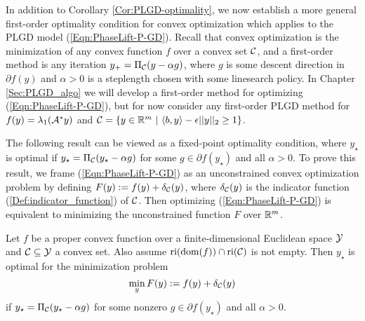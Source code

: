 



In addition to Corollary \ref{Cor:PLGD-optimality}, we now establish a more general first-order optimality condition for convex optimization which applies to the PLGD model (\ref{Eqn:PhaseLift-P-GD}).  
Recall that convex optimization is the minimization of any convex function $f$ over a convex set ${\mathcal C}$, and a first-order method is any iteration $y_+ = \Pi_{\mathcal C}(y - \alpha g)$, where $g$ is some descent direction in $\partial f(y)$ and $\alpha > 0$ is a steplength chosen with some linesearch policy.
In Chapter \ref{Sec:PLGD_algo} we will develop a first-order method for optimizing (\ref{Eqn:PhaseLift-P-GD}), but for now consider any first-order PLGD method for $f(y) = \lambda_1({\mathcal A}^*y)$ and ${\mathcal C} = \{ y \in \mathbb{R}^m \ | \ \langle b, y \rangle - \epsilon ||y||_2 \geq 1 \}$.




The following result can be viewed as a fixed-point optimality condition, where $y_\star$ is optimal if $y_\star = \Pi_{\mathcal C}(y_\star - \alpha g)$ for some $g \in \partial f(y_\star)$ and all $\alpha > 0$.  To prove this result, we frame (\ref{Eqn:PhaseLift-P-GD}) as an unconstrained convex optimization problem by defining $F(y) := f(y) + \delta_{\mathcal C}(y)$, where $\delta_{\mathcal C}(y)$ is the indicator function (\ref{Def:indicator_function}) of ${\mathcal C}$.  Then optimizing (\ref{Eqn:PhaseLift-P-GD}) is equivalent to minimizing the unconstrained function $F$ over ${\mathbb R}^m$.  

\begin{prop} 			\label{Prop:PLGD-opt_unconstrained}
Let $f$ be a proper convex function over a finite-dimensional Euclidean space ${\mathcal Y}$ and ${\mathcal C} \subseteq {\mathcal Y}$ a convex set.  Also assume $\textnormal{ri}( \textnormal{dom} (f)) \cap \textnormal{ri}({\mathcal C})$ is not empty.   Then $y_\star$ is optimal for the minimization problem
\begin{equation} 			\label{Eqn:subdiff_optimality_prop}
\min_{\substack{y}} F(y) := f(y) + \delta_{\mathcal C}(y)
\end{equation}
if $y_\star = \Pi_{\mathcal C}(y_\star - \alpha g)$ for some nonzero $g \in \partial f(y_\star)$ and all $\alpha >0$.
\end{prop}


